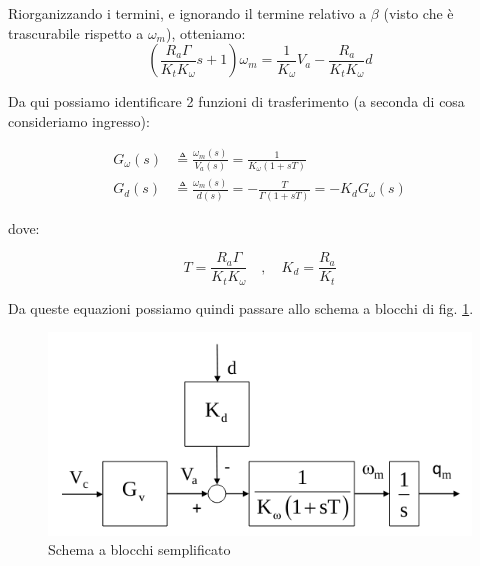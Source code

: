 Riorganizzando i termini, e ignorando il termine relativo a $\beta$ (visto che è trascurabile rispetto a $\omega_m$), otteniamo:
$$
\left( \frac{R_a \Gamma}{K_t K_\omega}s + 1 \right) \omega_m =
\frac{1}{K_\omega}V_a - \frac{R_a}{K_tK_\omega}d
$$

Da qui possiamo identificare 2 funzioni di trasferimento (a seconda di cosa consideriamo ingresso):

\begin{align}
G_\omega(s) &\triangleq \frac{\omega_m(s)}{V_a(s)} = \frac{1}{K_\omega(1 + sT)} \label{eq:tf_omega} \\
G_d(s) &\triangleq \frac{\omega_m(s)}{d(s)} = -\frac{T}{\Gamma(1 + sT)} = -K_dG_\omega(s)
\end{align}

dove:

$$
T = \frac{R_a \Gamma}{K_t K_\omega} 
\quad , \quad
K_d = \frac{R_a}{K_t}
$$

Da queste equazioni possiamo quindi passare allo schema a blocchi di fig. \ref{fig:decentralizedjointspacecontrol4}.

\begin{figure}[bh!]
	\centering
	\includegraphics[width=0.6\linewidth]{images/decentralized_joint_space_control_4}
	\caption{Schema a blocchi semplificato}
	\label{fig:decentralizedjointspacecontrol4}
\end{figure}




